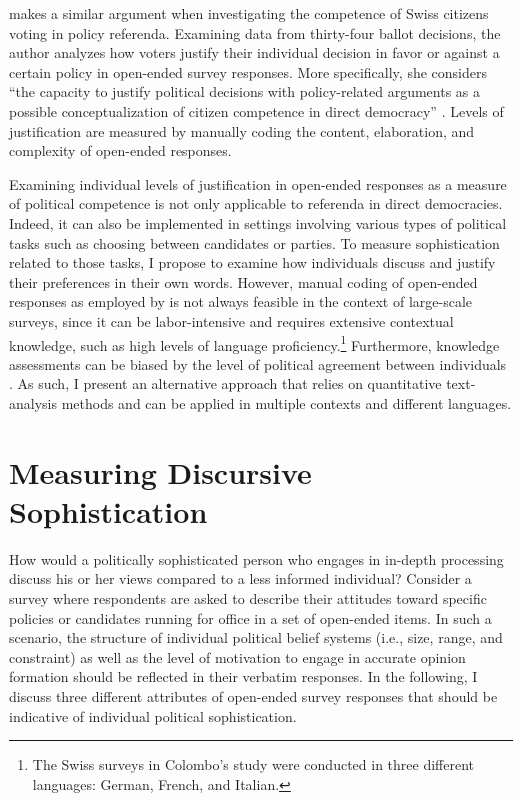 \citet{colombo2016justifications} makes a similar argument when investigating the competence of Swiss citizens voting in policy referenda. Examining data from thirty-four ballot decisions, the author analyzes how voters justify their individual decision in favor or against a certain policy in open-ended survey responses. More specifically, she considers ``the capacity to justify political decisions with policy-related arguments as a possible conceptualization of citizen competence in direct democracy'' \citep[3]{colombo2016justifications}. Levels of justification are measured by manually coding the content, elaboration, and complexity of open-ended responses.

Examining individual levels of justification in open-ended responses as a measure of political competence is not only applicable to referenda in direct democracies. Indeed, it can also be implemented in settings involving various types of political tasks such as choosing between candidates or parties. To measure sophistication related to those tasks, I propose to examine how individuals discuss and justify their preferences in their own words. However, manual coding of open-ended responses as employed by \citet{colombo2016justifications} is not always feasible in the context of large-scale surveys, since it can be labor-intensive and requires extensive contextual knowledge, such as high levels of language proficiency.\footnote{The Swiss surveys in Colombo's \citeyearpar{colombo2016justifications} study were conducted in three different languages: German, French, and Italian.} Furthermore, knowledge assessments can be biased by the level of political agreement between individuals \citep{ryan2011accuracy}. As such, I present an alternative approach that relies on quantitative text-analysis methods and can be applied in multiple contexts and different languages.



\section*{Measuring Discursive Sophistication}

How would a politically sophisticated person who engages in in-depth processing discuss his or her views compared to a less informed individual? Consider a survey where respondents are asked to describe their attitudes toward specific policies or candidates running for office in a set of open-ended items. In such a scenario, the structure of individual political belief systems (i.e., size, range, and constraint) as well as the level of motivation to engage in accurate opinion formation should be reflected in their verbatim responses. In the following, I discuss three different attributes of open-ended survey responses that should be indicative of individual political sophistication.

